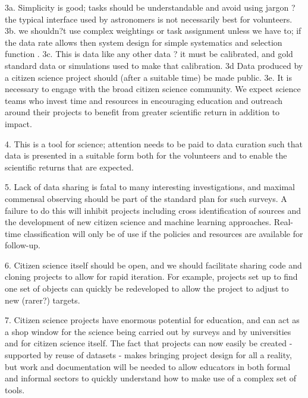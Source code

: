 \documentclass{pasa}
\begin{document}
\begin{enumerate}
3a. Simplicity is good; tasks should be understandable and avoid using jargon ? the typical interface used by astronomers is not necessarily best for volunteers. 
3b. we shouldn?t use complex weightings or task assignment unless we have to; if the data rate allows then system design for simple systematics and selection function . 
3c. This is data like any other data ? it must be calibrated, and gold standard data or simulations used to make that calibration.
3d Data produced by a citizen science project should (after a suitable time) be made public. 
3e. It is necessary to engage with the broad citizen science community. We expect science teams who invest time and resources in encouraging education and outreach around their projects to benefit from greater scientific return in addition to impact. 


4. This is a tool for science; attention needs to be paid to data curation such that data is presented in a suitable form both for the volunteers and to enable the scientific returns that are expected. 
	
5. Lack of data sharing is fatal to many interesting investigations, and maximal commensal observing should be part of the standard plan for such surveys. A failure to do this will inhibit projects including cross identification of sources and the development of new citizen science and machine learning approaches. Real-time classification will only be of use if the policies and resources are available for follow-up. 

6. Citizen science itself should be open, and we should facilitate sharing code and cloning projects to allow for rapid iteration. For example, projects set up to find one set of objects can quickly be redeveloped to allow the project to adjust to new (rarer?) targets.

7. Citizen science projects have enormous potential for education, and can act as a shop window for the science being carried out by surveys and by universities and for citizen science itself. The fact that projects can now easily be created - supported by reuse of datasets - makes bringing project design for all a reality, but work and documentation will be needed to allow educators in both formal and informal sectors to quickly understand how to make use of a complex set of tools. 

\end{enumerate} 
\end{document}
